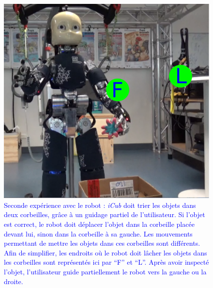 \documentclass[utf8]{frontiersSCNS} %
\newcommand{\rev}[1]{\textcolor{blue}{#1}}
\begin{document}
\begin{figure}[ht]
\centering
\includegraphics[width=0.5\hsize]{img/realXp.pdf}
\caption{\rev{Seconde expérience avec le robot : \textit{iCub} doit trier les objets dans deux corbeilles, grâce à un guidage partiel de l'utilisateur. Si l'objet est correct, le robot doit déplacer l'objet dans la corbeille placée devant lui, sinon dans la corbeille à sa gauche. Les mouvements permettant de mettre les objets dans ces corbeilles sont différents. Afin de simplifier, les endroits où le robot doit lâcher les objets dans les corbeilles sont représentés ici par ``F'' et ``L''. Après avoir inspecté l'objet, l'utilisateur guide partiellement le robot vers la gauche ou la droite.}}
\label{figure:sortingiCub}
\end{figure}
\end{document}
